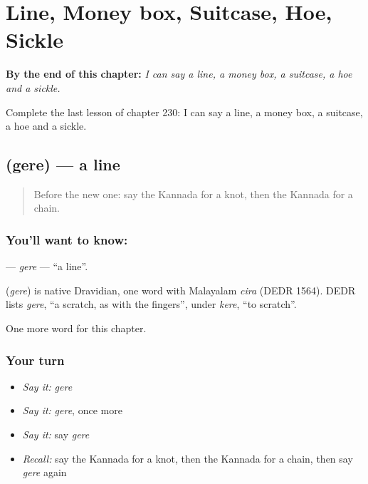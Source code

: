 
\chapter{Line, Money box, Suitcase, Hoe, Sickle}
\label{ch:ka-line-money-box-suitcase-hoe-sickle}

\begin{chapteropening}
\textbf{By the end of this chapter:} \emph{I can say a line, a money box, a suitcase, a hoe and a sickle.}

Complete the last lesson of chapter 230: I can say a line, a money box, a suitcase, a hoe and a sickle.
\end{chapteropening}

\section[\texorpdfstring{\kn{ಗೆರೆ} (gere)}{ಗೆರೆ (gere)}]{ (gere) — a line}

\label{lesson:KA-C230-gere}



\begin{quote}
Before the new one: say the Kannada for a knot, then the Kannada for a chain.
\end{quote}

\subsection*{You'll want to know: }
\textbf{} — \emph{gere} — \textquotedblleft{}a line\textquotedblright{}.

\begin{cousinweb}
\textbf{} (\emph{gere}) is native Dravidian, one word with Malayalam \emph{cira} (DEDR 1564). DEDR lists \emph{gere}, \textquotedblleft{}a scratch, as with the fingers\textquotedblright{}, under \emph{kere}, \textquotedblleft{}to scratch\textquotedblright{}.
\end{cousinweb}

\begin{grammarlens}[title={What you've built}]
One more word for this chapter.
\end{grammarlens}

\subsection*{Your turn}
\begin{itemize}
\raggedright
  \item \emph{Say it:} \emph{gere}
  \item \emph{Say it:} \emph{gere}, once more
  \item \emph{Say it:} say \emph{gere}
  \item \emph{Recall:} say the Kannada for a knot, then the Kannada for a chain, then say \emph{gere} again
\end{itemize}

